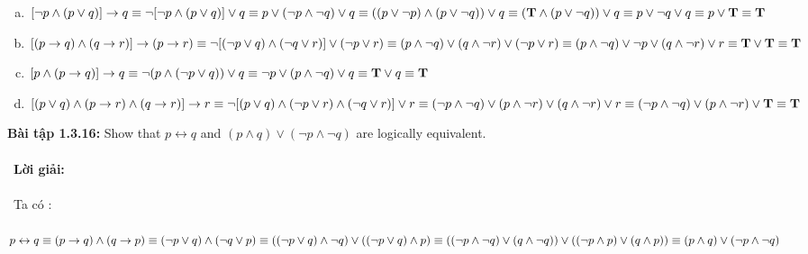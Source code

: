 \documentclass[a4paper]{article}
\begin{document}
\begin{enumerate}[a)]
	\item $[\lnot p \land (p \lor q)] \rightarrow q \\\equiv \lnot[\lnot p \land (p \lor q)] \lor q \\\equiv p \lor (\lnot p \land \lnot q) \lor q \\\equiv ((p \lor \lnot p) \land (p \lor \lnot q)) \lor q \\\equiv (\textbf{T} \land (p \lor \lnot q))\lor q \\\equiv p \lor \lnot q \lor q \equiv p \lor \textbf{T} \equiv \textbf{T}$
	\item $[(p \rightarrow q) \land (q \rightarrow r)] \rightarrow (p \rightarrow r) \\\equiv \lnot [(\lnot p \lor q) \land (\lnot q \lor r)] \lor (\lnot p \lor r) \\\equiv (p \land \lnot q) \lor (q \land \lnot r) \lor (\lnot p \lor r) \\\equiv (p \land \lnot q)\lor \lnot p \lor (q \land \lnot r) \lor r \\\equiv \textbf{T} \lor \textbf{T} \equiv \textbf{T}$
	\item $[p \land (p \rightarrow q)] \rightarrow q \\\equiv \lnot(p \land (\lnot p \lor q))\lor q \\\equiv \lnot p \lor (p \land \lnot q) \lor q \\\equiv \textbf{T} \lor q \equiv \textbf{T}$
	\item $[(p \lor q) \land (p \rightarrow r) \land (q \rightarrow r)] \rightarrow r \\\equiv \lnot [(p \lor q) \land (\lnot p \lor r) \land (\lnot q \lor r)] \lor r \\\equiv (\lnot p \land \lnot q) \lor (p \land \lnot r) \lor (q \land \lnot r) \lor r \\\equiv (\lnot p \land \lnot q) \lor (p \land \lnot r) \lor \textbf{T} \equiv \textbf{T}$
\end{enumerate}
\textbf{Bài tập 1.3.16:} Show that $p \leftrightarrow q$ and $(p \land q) \lor (\lnot p \land \lnot q)$ are logically
equivalent. \\\ \\\
\textbf{Lời giải:} \\\ \\\
Ta có : \\\ 
$p \leftrightarrow q \\\equiv (p \rightarrow q) \land (q \rightarrow p) \\\equiv (\lnot p \lor q) \land (\lnot q \lor p) \\\equiv ((\lnot p \lor q)\land \lnot q) \lor ((\lnot p \lor q)\land p) \\\equiv ((\lnot p \land \lnot q) \lor (q \land \lnot q)) \lor ((\lnot p \land p) \lor (q \land p)) \\\equiv (p \land q) \lor (\lnot p \land \lnot q)$ \\\ \\\
\end{document}
